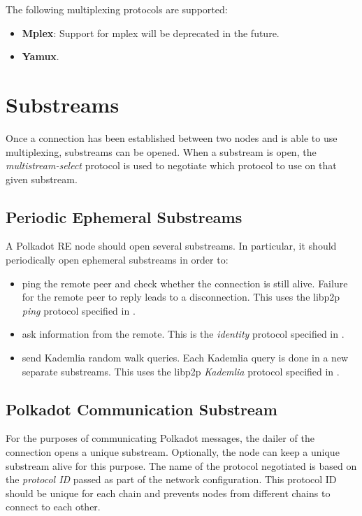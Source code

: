 \documentclass{book}
\newcommand{\tmem}[1]{{\em #1\/}}
\newcommand{\tmstrong}[1]{\textbf{#1}}
\begin{document}
The following multiplexing protocols are supported:
\begin{itemize}
  \item {\tmstrong{Mplex}}: Support for mplex will be deprecated in the
  future.
  
  \item {\tmstrong{Yamux}}.
\end{itemize}

\section{Substreams}

Once a connection has been established between two nodes and is able to use
multiplexing, substreams can be opened. When a substream is open, the
{\tmem{multistream-select}} protocol is used to negotiate which protocol to
use on that given substream.

\subsection{Periodic Ephemeral Substreams}

A Polkadot RE node should open several substreams. In particular, it should
periodically open ephemeral substreams in order to:
\begin{itemize}
  \item ping the remote peer and check whether the connection is still alive.
  Failure for the remote peer to reply leads to a disconnection. This uses the
  libp2p {\tmem{ping}} protocol specified in
  {\cite{protocol_labs_libp2p_2019}}.
  
  \item ask information from the remote. This is the {\tmem{identity}}
  protocol specified in {\cite{protocol_labs_libp2p_2019}}.
  
  \item send Kademlia random walk queries. Each Kademlia query is done in a
  new separate substreams. This uses the libp2p {\tmem{Kademlia}} protocol
  specified in {\cite{protocol_labs_libp2p_2019}}.
\end{itemize}

\subsection{Polkadot Communication Substream}

For the purposes of communicating Polkadot messages, the dailer of the
connection opens a unique substream. Optionally, the node can keep a unique
substream alive for this purpose. The name of the protocol negotiated is based
on the {\tmem{protocol ID}} passed as part of the network configuration. This
protocol ID should be unique for each chain and prevents nodes from different
chains to connect to each other.
\end{document}
